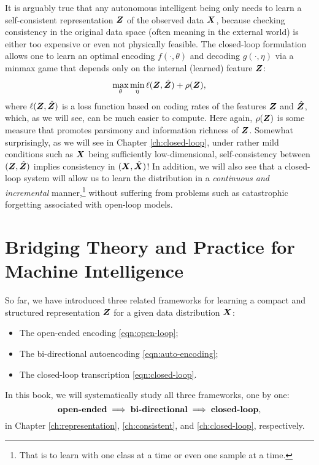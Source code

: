 \documentclass[\toplevelprefix/book-main.tex]{subfiles}
\begin{document}
It is arguably true that any  autonomous intelligent being only needs to learn a self-consistent representation $\bm{Z}$ of the observed data $\bm{X}$, because checking consistency in the original data space (often meaning in the external world) is either too expensive or even not physically feasible. The closed-loop formulation allows one to learn an optimal encoding $f(\cdot, \theta)$ and decoding $g(\cdot, \eta)$ via a minmax game that depends only on the internal (learned) feature $\bm{Z}$:
\begin{equation}
\max_{\theta}\min_{\eta} \ell( \bm{Z}, \hat {\bm{Z}}) + \rho(\bm{Z}), 
   \label{eqn:closed-loop-objective}
\end{equation}
where $\ell( \bm{Z}, \hat {\bm{Z}})$ is a loss function based on coding rates of the features $\bm{Z}$ and $\hat {\bm{Z}}$, which, as we will see, can be much easier to compute. Here again, $\rho(\bm{Z})$ is some measure that promotes parsimony and information richness of $\bm{Z}$. Somewhat surprisingly, as we will see in Chapter \ref{ch:closed-loop}, under rather mild conditions such as $\bm{X}$ being sufficiently low-dimensional, self-consistency between $(\bm{Z}, \hat {\bm{Z}})$ implies consistency in $(\bm{X}, \hat {\bm{X}})$! In addition, we will also see that a closed-loop system will allow us to learn the distribution in a {\em continuous and incremental} manner,\footnote{That is to learn with one class at a time or even one sample at a time.} without suffering from problems such as catastrophic forgetting associated with open-loop models. 

\section{Bridging Theory and Practice for Machine Intelligence}
So far, we have introduced three related  frameworks for learning a compact and structured representation $\bm{Z}$ for a given data distribution $\bm{X}$: 
\begin{itemize}
\item The open-ended encoding \eqref{eqn:open-loop};
\item The bi-directional autoencoding \eqref{eqn:auto-encoding};
\item The closed-loop transcription \eqref{eqn:closed-loop}.
\end{itemize}
In this book, we will systematically study all three frameworks, one by one:
\begin{equation}
    \mbox{\textbf{open-ended}} \; \Longrightarrow \; 
    \mbox{\textbf{bi-directional}} \;  \Longrightarrow \; \mbox{\textbf{closed-loop}},
\end{equation}
in Chapter \ref{ch:representation}, \ref{ch:consistent}, and \ref{ch:closed-loop}, respectively.
\end{document}
